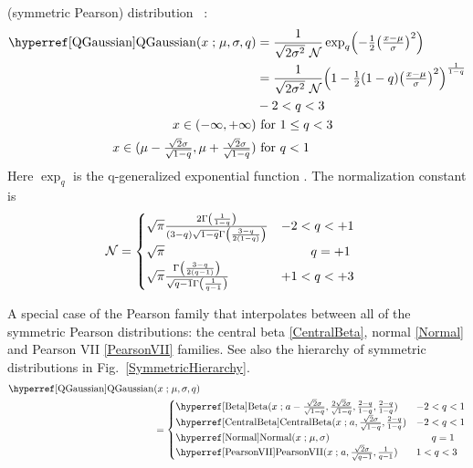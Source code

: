  (symmetric Pearson) distribution~\cite{Leeuwen1995} :
\begin{align}
\label{QGaussian}
\opr{QGaussian}(x\given \mu,\sigma,q) &= \frac{1}{\sqrt{2\sigma^2}  \ \mathcal{N}} \exp_q\Left(-\half \Left(\tfrac{x-\mu}{\sigma}\Right)^2 \Right) \checked
\\
 \notag
& = \frac{1}{\sqrt{2\sigma^2} \ \mathcal{N}}  \Left(1- \half (1-q) \Left(\tfrac{x-\mu}{\sigma}\Right)^2 \Right)^{\frac{1}{1-q} } \checked
\\
& -2 < q < 3
\notag
\\
x \in (-\infty, +\infty) &\text{ for } 1\leq q < 3
\notag
\\
x \in (\mu-{\tfrac{\sqrt{2}\sigma}{\sqrt{1-q}}}, \mu+{\tfrac{\sqrt{2}\sigma}{\sqrt{1-q}}}) & \text{ for } q < 1
\notag
\end{align}
Here $ \exp_q$ is the q-generalized exponential function . The normalization constant is
\begin{align*}
\mathcal{N} &=
 \begin{cases} 
 \sqrt{\pi} \frac{   {2  \Gamma\Left({\frac{1}{1-q}}\Right)} }{ {(3-q) \sqrt{1-q} \Gamma\Left(\frac{3-q }{ 2(1-q)} \Right)}  } 
 & -2 <q < +1 \checked
\\
  \sqrt{\pi} & \phantom{-2<}q=+1  \checked
\\
 \sqrt{\pi}  \frac{{\Gamma\Left({\frac{3-q}{2(q-1)}}\Right)} }{ {\sqrt{q-1} \Gamma\Left(\frac{1 }{ q-1}\Right)}}&  +1<q<+3 \checked
\end{cases}
 \end{align*}

A special case of the Pearson family that interpolates between all of the symmetric Pearson distributions: the central beta \eqref{CentralBeta}, normal \eqref{Normal} and Pearson VII \eqref{PearsonVII} families. See also the hierarchy of symmetric distributions in Fig.~\ref{SymmetricHierarchy}.
\begin{align*}
\opr{QGaussian}&(x\given \mu,\sigma,q) \\ &=
 \begin{cases}
\opr{Beta}(x\given a-\tfrac{\sqrt{2}\sigma}{\sqrt{1-q}},\tfrac{2\sqrt{2}\sigma}{\sqrt{1-q}},\tfrac{2-q}{1-q},\tfrac{2-q}{1-q}) 
 & -2 <q < 1 \checked
 \\
\opr{CentralBeta}(x\given a,\tfrac{\sqrt{2}\sigma}{\sqrt{1-q}}, \tfrac{2-q}{1-q}) 
 & -2 <q < 1 \checked
\\
\opr{Normal}(x\given \mu,\sigma)   & \phantom{1<}q=1  \checked
\\
 \opr{PearsonVII}(x\given a,\tfrac{\sqrt{2}\sigma}{\sqrt{q-1}}, \tfrac{1}{q-1}) &  1<q<3 \checked
\end{cases}
 \end{align*}



